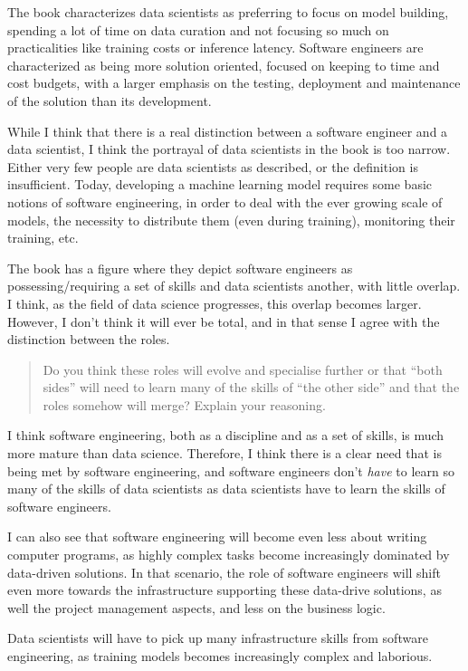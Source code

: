 \documentclass[11pt]{article}
\begin{document}
The book characterizes data scientists as preferring to focus on model building, spending a lot of time on data curation and not focusing so much on practicalities like training costs or inference latency.
Software engineers are characterized as being more solution oriented, focused on keeping to time and cost budgets, with a larger emphasis on the testing, deployment and maintenance of the solution than its development.

While I think that there is a real distinction between a software engineer and a data scientist, I think the portrayal of data scientists in the book is too narrow.
Either very few people are data scientists as described, or the definition is insufficient.
Today, developing a machine learning model requires some basic notions of software engineering, in order to deal with the ever growing scale of models, the necessity to distribute them (even during training), monitoring their training, etc.

The book has a figure where they depict software engineers as possessing/requiring a set of skills and data scientists another, with little overlap.
I think, as the field of data science progresses, this overlap becomes larger.
However, I don't think it will ever be total, and in that sense I agree with the distinction between the roles.

\begin{quote}
Do you think these roles will evolve and specialise further or that “both sides” will need to learn many of the skills of “the other side” and that the roles somehow will merge? Explain your reasoning. 
\end{quote}

I think software engineering, both as a discipline and as a set of skills, is much more mature than data science.
Therefore, I think there is a clear need that is being met by software engineering, and software engineers don't \emph{have} to learn so many of the skills of data scientists as data scientists have to learn the skills of software engineers.

I can also see that software engineering will become even less about writing computer programs, as highly complex tasks become increasingly dominated by data-driven solutions.
In that scenario, the role of software engineers will shift even more towards the infrastructure supporting these data-drive solutions, as well the project management aspects, and less on the business logic.

Data scientists will have to pick up many infrastructure skills from software engineering, as training models becomes increasingly complex and laborious.
\end{document}
